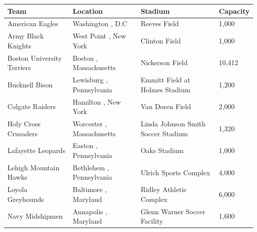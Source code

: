 \documentclass{article}
\begin{document}
\begin{tabular}{llll}
\toprule
Team & Location & Stadium & Capacity \\
\midrule
American Eagles & Washington , D.C & Reeves Field & 1,000 \\
Army Black Knights & West Point , New York & Clinton Field & 1,000 \\
Boston University Terriers & Boston , Massachusetts & Nickerson Field & 10,412 \\
Bucknell Bison & Lewisburg , Pennsylvania & Emmitt Field at Holmes Stadium & 1,200 \\
Colgate Raiders & Hamilton , New York & Van Doren Field & 2,000 \\
Holy Cross Crusaders & Worcester , Massachusetts & Linda Johnson Smith Soccer Stadium & 1,320 \\
Lafayette Leopards & Easton , Pennsylvania & Oaks Stadium & 1,000 \\
Lehigh Mountain Hawks & Bethlehem , Pennsylvania & Ulrich Sports Complex & 4,000 \\
Loyola Greyhounds & Baltimore , Maryland & Ridley Athletic Complex & 6,000 \\
Navy Midshipmen & Annapolis , Maryland & Glenn Warner Soccer Facility & 1,600 \\
\bottomrule
\end{tabular}
\end{document}
